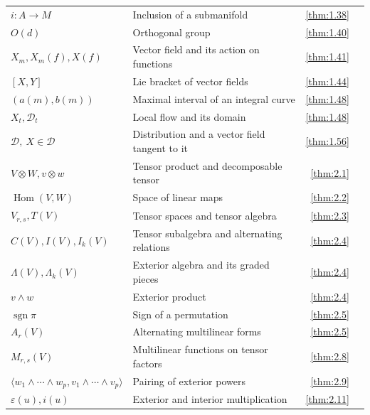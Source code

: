 {\begin{longtable}{@{}>{\raggedright\arraybackslash}p{.39\linewidth}>{\raggedright\arraybackslash}p{.39\linewidth}r r@{}}
$i:A\to M$ & Inclusion of a submanifold & \ref{thm:1.38} & \pageref{thm:1.38} \\
$O(d)$ & Orthogonal group & \ref{thm:1.40} & \pageref{thm:1.40} \\
$X_{m},\allowbreak  X_{m}(f),\allowbreak  X(f)$ & Vector field and its action on functions & \ref{thm:1.41} & \pageref{thm:1.41} \\
$[X,\allowbreak Y]$ & Lie bracket of vector fields & \ref{thm:1.44} & \pageref{thm:1.44} \\
$(a(m),\allowbreak b(m))$ & Maximal interval of an integral curve & \ref{thm:1.48} & \pageref{thm:1.48} \\
$X_t,\allowbreak \mathcal D_t$ & Local flow and its domain & \ref{thm:1.48} & \pageref{thm:1.48} \\
$\mathcal D,\allowbreak \ X\in\mathcal D$ & Distribution and a vector field tangent to it & \ref{thm:1.56} & \pageref{thm:1.56} \\
$V\otimes W,\allowbreak  v\otimes w$ & Tensor product and decomposable tensor & \ref{thm:2.1} & \pageref{thm:2.1} \\
$\operatorname{Hom}(V,\allowbreak W)$ & Space of linear maps & \ref{thm:2.2} & \pageref{thm:2.2} \\
$V_{r,\allowbreak s},\allowbreak  T(V)$ & Tensor spaces and tensor algebra & \ref{thm:2.3} & \pageref{thm:2.3} \\
$C(V),\allowbreak  I(V),\allowbreak  I_{k}(V)$ & Tensor subalgebra and alternating relations & \ref{thm:2.4} & \pageref{thm:2.4} \\
$\Lambda(V),\allowbreak  \Lambda_{k}(V)$ & Exterior algebra and its graded pieces & \ref{thm:2.4} & \pageref{thm:2.4} \\
$v\wedge w$ & Exterior product & \ref{thm:2.4} & \pageref{thm:2.4} \\
$\operatorname{sgn}\pi$ & Sign of a permutation & \ref{thm:2.5} & \pageref{thm:2.5} \\
$A_{r}(V)$ & Alternating multilinear forms & \ref{thm:2.5} & \pageref{thm:2.5} \\
$M_{r,\allowbreak s}(V)$ & Multilinear functions on tensor factors & \ref{thm:2.8} & \pageref{thm:2.8} \\
$\langle w_{1}\wedge\cdots\wedge w_{p},\allowbreak v_{1}\wedge\cdots\wedge v_{p}\rangle$ & Pairing of exterior powers & \ref{thm:2.9} & \pageref{thm:2.9} \\
$\varepsilon(u),\allowbreak  i(u)$ & Exterior and interior multiplication & \ref{thm:2.11} & \pageref{thm:2.11} \\

\end{longtable}}
